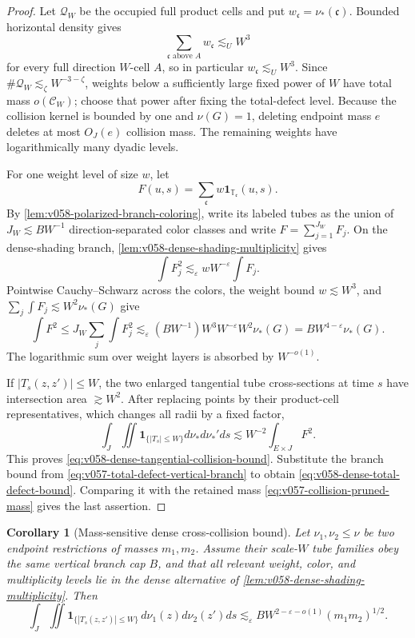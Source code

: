 \documentclass[10pt]{article}
\newtheorem{corollary}[theorem]{Corollary}
\begin{document}
\begin{proof}
Let \(\mathscr Q_W\) be the occupied full product cells and put
\(w_{\mathfrak c}=\nu_*(\mathfrak c)\).  Bounded horizontal density gives
\[
\sum_{\mathfrak c\text{ above }A}w_{\mathfrak c}
\lesssim_U W^3
\]
for every full direction \(W\)-cell \(A\), so in particular
\(w_{\mathfrak c}\lesssim_UW^3\).  Since
\(\#\mathscr Q_W\lesssim_\zeta W^{-3-\zeta}\), weights below a sufficiently large fixed power of
\(W\) have total mass \(o(\mathcal C_W)\); choose that power after fixing the total-defect level.
Because the collision kernel is bounded by one and \(\nu(G)=1\), deleting endpoint mass \(e\)
deletes at most \(O_J(e)\) collision mass.  The remaining weights have logarithmically many dyadic
levels.

For one weight level of size \(w\), let
\[
F(u,s)=\sum_{\mathfrak c}w\mathbf 1_{\mathbb T_{\mathfrak c}}(u,s).
\]
By \cref{lem:v058-polarized-branch-coloring}, write its labeled tubes as the union of
\(J_W\lesssim BW^{-1}\) direction-separated color classes and write
\(F=\sum_{j=1}^{J_W}F_j\).  On the dense-shading branch,
\cref{lem:v058-dense-shading-multiplicity} gives
\[
\int F_j^2
\lesssim_\varepsilon
wW^{-\varepsilon}\int F_j.
\]
Pointwise Cauchy--Schwarz across the colors, the weight bound \(w\lesssim W^3\), and
\(\sum_j\int F_j\lesssim W^2\nu_*(G)\) give
\[
\int F^2
\le
J_W\sum_j\int F_j^2
\lesssim_\varepsilon
(BW^{-1})W^3W^{-\varepsilon}W^2\nu_*(G)
=
BW^{4-\varepsilon}\nu_*(G).
\]
The logarithmic sum over weight layers is absorbed by \(W^{-o(1)}\).

If \(|T_s(z,z')|\le W\), the two enlarged tangential tube cross-sections at time \(s\) have
intersection area \(\gtrsim W^2\).  After replacing points by their product-cell representatives,
which changes all radii by a fixed factor,
\[
\int_J\iint
\mathbf 1_{\{|T_s|\le W\}}d\nu_*d\nu_*'ds
\lesssim
W^{-2}\int_{E\times J}F^2.
\]
This proves \eqref{eq:v058-dense-tangential-collision-bound}.  Substitute the branch bound from
\eqref{eq:v057-total-defect-vertical-branch} to obtain
\eqref{eq:v058-dense-total-defect-bound}.  Comparing it with the retained mass
\eqref{eq:v057-collision-pruned-mass} gives the last assertion.
\end{proof}

\begin{corollary}[Mass-sensitive dense cross-collision bound]
\label{cor:v059-mass-sensitive-dense-cross-bound}
Let \(\nu_1,\nu_2\le\nu\) be two endpoint restrictions of masses
\(m_1,m_2\).  Assume their scale-\(W\) tube families obey the same vertical branch cap \(B\), and
that all relevant weight, color, and multiplicity levels lie in the dense alternative of
\cref{lem:v058-dense-shading-multiplicity}.  Then
\begin{equation}
\label{eq:v059-mass-sensitive-dense-cross-bound}
\boxed{
\int_J\iint
\mathbf 1_{\{|T_s(z,z')|\le W\}}
\,d\nu_1(z)d\nu_2(z')ds
\lesssim_\varepsilon
B W^{2-\varepsilon-o(1)}(m_1m_2)^{1/2}.
}
\end{equation}
\end{corollary}
\end{document}
